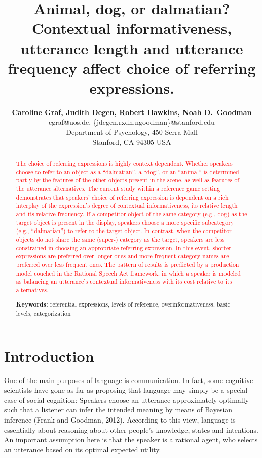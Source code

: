 \documentclass[10pt,letterpaper]{article}
\title{Animal, dog, or dalmatian? Contextual informativeness, utterance length and utterance frequency affect choice of referring expressions.}
\author{{\large \bf Caroline Graf, Judith Degen, Robert Hawkins, Noah D.~Goodman} \\
  cgraf@uos.de, \{jdegen,rxdh,ngoodman\}@stanford.edu\\
  Department of Psychology, 450 Serra Mall \\
  Stanford, CA 94305 USA}
\newcommand{\red}[1]{\textcolor{Red}{#1}}
\begin{document}
\maketitle


\begin{abstract}

\red{The choice of referring expressions is highly context dependent. Whether speakers choose to refer to an object as a ``dalmatian'', a ``dog'', or an ``animal'' is determined partly by the features of the other objects present in the scene, as well as features of the utterance alternatives. The current study within a reference game setting demonstrates that speakers' choice of referring expression is dependent on a rich interplay of the expression's degree of contextual informativeness, its relative length and its relative frequency. If a competitor object of the same category (e.g., dog) as the target object is present in the display, speakers choose a more specific subcategory (e.g., ``dalmatian'') to refer to the target object. In contrast, when the competitor objects do not share the same (super-) category as the target, speakers are less constrained in choosing an appropriate referring expression. In this event, shorter expressions are preferred over longer ones and more frequent category names are preferred over less frequent ones. The pattern of results is predicted by a production model couched in the Rational Speech Act framework, in which a speaker is modeled as balancing an utterance's contextual informativeness with its cost relative to its alternatives.}

\textbf{Keywords:} 
referential expressions, levels of reference, overinformativeness, basic levels, categorization
\end{abstract}

\section{\bf Introduction}
One of the main purposes of language is communication. In fact, some cognitive scientists have gone as far as proposing that language may simply be a special case of social cognition: Speakers choose an utterance approximately optimally such that a listener can infer the intended meaning by means of Bayesian inference (Frank and Goodman, 2012). According to this view, language is essentially about reasoning about other people's knowledge, states and intentions. An important assumption here is that the speaker is a rational agent, who selects an utterance based on its optimal expected utility. 
\end{document}
